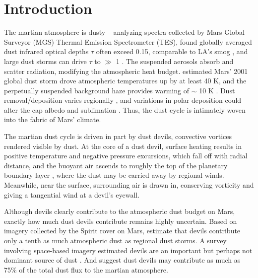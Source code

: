 \documentclass{aastex63}
\begin{document}
\section{Introduction} \label{sec:introduction}
The martian atmosphere is dusty -- analyzing spectra collected by Mars Global Surveyor (MGS) Thermal Emission Spectrometer (TES), \citet{2004Icar..167..148S} found globally averaged dust infrared optical depths $\tau$ often exceed 0.15, comparable to LA's smog \citep{2007JGRD..11222S21R}, and large dust storms can drive $\tau$ to $\gg$ 1 \citep{2002Icar..157..259S}. The suspended aerosols absorb and scatter radiation, modifying the atmospheric heat budget. \citet{2002Icar..157..259S} estimated Mars' 2001 global dust storm drove atmospheric temperatures up by at least 40 K, and the perpetually suspended background haze provides warming of $\sim$ 10 K \citep{2004JGRE..10911006B}. Dust removal/deposition varies regionally \citep{2006JGRE..111.6008K}, and variations in polar deposition could alter the cap albedo and sublimation \citep{1995JGR...100.5501H}. Thus, the dust cycle is intimately woven into the fabric of Mars' climate.

The martian dust cycle is driven in part by dust devils, convective vortices rendered visible by dust. At the core of a dust devil, surface heating results in positive temperature and negative pressure excursions, which fall off with radial distance, and the buoyant air ascends to roughly the top of the planetary boundary layer \citep{1998JAtS...55.3244R}, where the dust may be carried away by regional winds. Meanwhile, near the surface, surrounding air is drawn in, conserving vorticity and giving a tangential wind at a devil's eyewall. 

Although devils clearly contribute to the atmospheric dust budget on Mars, exactly how much dust devils contribute remains highly uncertain. Based on imagery collected by the Spirit rover on Mars, \citet{2006JGRE..11112S09G} estimate that devils contribute only a tenth as much atmospheric dust as regional dust storms. A survey involving space-based imagery estimated devils are an important but perhaps not dominant source of dust \citep{2006JGRE..11112002C}. And \citet{2016SSRv..203...89F} suggest dust devils may contribute as much as 75\% of the total dust flux to the martian atmosphere. 
\end{document}
